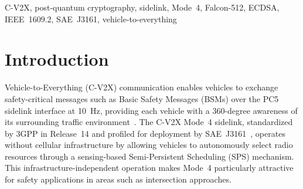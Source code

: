 \documentclass[letterpaper,journal]{IEEEtran}
\begin{document}
\begin{abstract}
Wireless connectivity, such as Cellular-Vehicle-to-Everything (C-V2X), between vehicles and transportation infrastructure promises significant roadway safety benefits by providing 360-degree views of their surroundings. However, wireless connectivity in intelligent transportation systems is vulnerable to deliberate cyber threats. Security of wireless connectivity relies on traditional cryptographic techniques as specified in the IEEE 1609.2 standard. The anticipated advent of quantum computing can compromise this cryptographic foundation. Post-quantum cryptographic (PQC) algorithms offer quantum-resistant alternatives. However, the significantly larger size of PQC signatures and public keys poses a challenge to meet communication latency for safety-critical transportation applications. This study conducts a comprehensive evaluation of standardized PQC algorithms on C-V2X sidelink performance to assess the feasibility of implementing PQC in safety-critical transportation applications. C-V2X sidelink key performance indicators (KPIs), including packet delivery ratio (PDR), end-to-end latency, channel busy ratio (CBR), and resource utilization, are compared across PQC algorithms at varying levels of service at an urban roadway intersection to confirm their applicability.

\end{abstract}

\begin{IEEEkeywords}
C-V2X, post-quantum cryptography, sidelink, Mode~4, Falcon-512, ECDSA, IEEE~1609.2, SAE~J3161, vehicle-to-everything
\end{IEEEkeywords}

\section{Introduction}
 Vehicle-to-Everything (C-V2X) communication enables vehicles to exchange safety-critical messages such as Basic Safety Messages (BSMs) over the PC5 sidelink interface at 10~Hz, providing each vehicle with a 360-degree awareness of its surrounding traffic environment~\cite{molina2017lte}. The C-V2X Mode~4 sidelink, standardized by 3GPP in Release~14 and profiled for deployment by SAE~J3161~\cite{sae_j3161}, operates without cellular infrastructure by allowing vehicles to autonomously select radio resources through a sensing-based Semi-Persistent Scheduling (SPS) mechanism. This infrastructure-independent operation makes Mode~4 particularly attractive for safety applications in areas such as intersection approaches.
\end{document}
